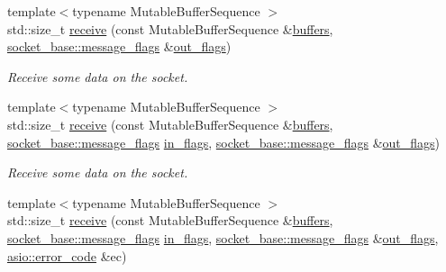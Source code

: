 \begin{DoxyCompactItemize}
\item 
{\footnotesize template$<$typename Mutable\+Buffer\+Sequence $>$ }\\std\+::size\+\_\+t \hyperlink{classasio_1_1basic__seq__packet__socket_afe1fd6168b8a97159dd6d23eb3266eca}{receive} (const Mutable\+Buffer\+Sequence \&\hyperlink{group__async__read_ga54dede45c3175148a77fe6635222c47d}{buffers}, \hyperlink{classasio_1_1socket__base_ac3cf77465dfedfe1979b5415cf32cc94}{socket\+\_\+base\+::message\+\_\+flags} \&\hyperlink{classasio_1_1basic__seq__packet__socket_a8e5185dc6014d8e5f9e91ab7743ace7c}{out\+\_\+flags})
\begin{DoxyCompactList}\small\item\em Receive some data on the socket. \end{DoxyCompactList}\item 
{\footnotesize template$<$typename Mutable\+Buffer\+Sequence $>$ }\\std\+::size\+\_\+t \hyperlink{classasio_1_1basic__seq__packet__socket_a62583bc09ddc7e60b195b6cd77704939}{receive} (const Mutable\+Buffer\+Sequence \&\hyperlink{group__async__read_ga54dede45c3175148a77fe6635222c47d}{buffers}, \hyperlink{classasio_1_1socket__base_ac3cf77465dfedfe1979b5415cf32cc94}{socket\+\_\+base\+::message\+\_\+flags} \hyperlink{classasio_1_1basic__seq__packet__socket_aabcc430c9e81052d026b2994274c0fd1}{in\+\_\+flags}, \hyperlink{classasio_1_1socket__base_ac3cf77465dfedfe1979b5415cf32cc94}{socket\+\_\+base\+::message\+\_\+flags} \&\hyperlink{classasio_1_1basic__seq__packet__socket_a8e5185dc6014d8e5f9e91ab7743ace7c}{out\+\_\+flags})
\begin{DoxyCompactList}\small\item\em Receive some data on the socket. \end{DoxyCompactList}\item 
{\footnotesize template$<$typename Mutable\+Buffer\+Sequence $>$ }\\std\+::size\+\_\+t \hyperlink{classasio_1_1basic__seq__packet__socket_a3489347e101ca045c9edc61859065c54}{receive} (const Mutable\+Buffer\+Sequence \&\hyperlink{group__async__read_ga54dede45c3175148a77fe6635222c47d}{buffers}, \hyperlink{classasio_1_1socket__base_ac3cf77465dfedfe1979b5415cf32cc94}{socket\+\_\+base\+::message\+\_\+flags} \hyperlink{classasio_1_1basic__seq__packet__socket_aabcc430c9e81052d026b2994274c0fd1}{in\+\_\+flags}, \hyperlink{classasio_1_1socket__base_ac3cf77465dfedfe1979b5415cf32cc94}{socket\+\_\+base\+::message\+\_\+flags} \&\hyperlink{classasio_1_1basic__seq__packet__socket_a8e5185dc6014d8e5f9e91ab7743ace7c}{out\+\_\+flags}, \hyperlink{classasio_1_1error__code}{asio\+::error\+\_\+code} \&ec)

\end{DoxyCompactItemize}
